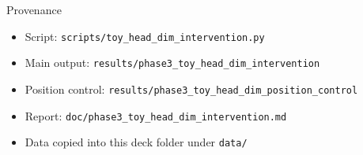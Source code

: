 \documentclass[aspectratio=169]{beamer}
\begin{document}
\begin{frame}{Provenance}
  \begin{itemize}
    \item Script: \texttt{scripts/toy\_head\_dim\_intervention.py}
    \item Main output: \texttt{results/phase3\_toy\_head\_dim\_intervention}
    \item Position control: \texttt{results/phase3\_toy\_head\_dim\_position\_control}
    \item Report: \texttt{doc/phase3\_toy\_head\_dim\_intervention.md}
    \item Data copied into this deck folder under \texttt{data/}
  \end{itemize}
\end{frame}
\end{document}

